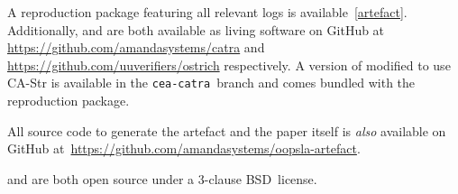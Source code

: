 A reproduction package featuring all relevant logs is available~\cref{artefact}.
Additionally, \Ostrich{} and \Catra{} are both available as living software
on GitHub at \url{https://github.com/amandasystems/catra} and \url{https://github.com/uuverifiers/ostrich}
respectively. A version of \Ostrich{} modified to use CA-Str is available in the \texttt{cea-catra}~branch
and comes bundled with the reproduction package.

All source code to generate the artefact and the paper itself is \emph{also} available on 
GitHub at~\url{https://github.com/amandasystems/oopsla-artefact}.

\Ostrich{} and \Catra{} are both open source under a 3-clause BSD~license.
